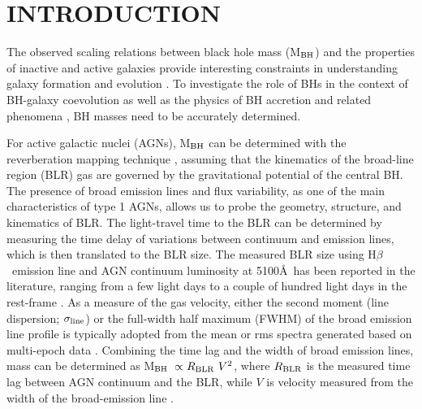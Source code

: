 \documentclass[iop]{emulateapj}
\newcommand{\Hb}{\rm H{$\beta$}}
\newcommand{\mbh}{M$_{\rm BH}$}
\newcommand{\sigmaline}{$\sigma_{\rm line}$}
\begin{document}
\section{INTRODUCTION} \label{section:intro}

The observed scaling relations between black hole mass (M$_{\rm BH}$) and the properties of inactive and active galaxies 
provide interesting constraints in understanding galaxy formation and evolution \citep[see][]{KormendyHo2013}. 
To investigate the role of BHs in the context of BH-galaxy coevolution \citep[e.g.,][]{Peng2006,Woo2006,Treu2007,Jahnke2009,Merloni2010,Bennert2010,Bennert2011b,Cisternas2011,Bennert2015,Park2015} as well as the physics of BH accretion and related phenomena \citep[e.g.,][]{WooUrry2002, Kollmeier2006,Davis2007,Bentz2013,Woo+16},
BH masses need to be accurately determined. 

For active galactic nuclei (AGNs),  M$_{\rm BH}$ can be determined with the reverberation mapping technique \citep{Blandford1982,Peterson1993},
assuming that the kinematics of the broad-line region (BLR) gas are governed by the gravitational potential of the central BH. 
The presence of broad emission lines and flux variability, as one of the main characteristics of type 1 AGNs, allows us to probe the geometry, structure, and kinematics of BLR. The light-travel time to the BLR can be determined by measuring the time delay of variations between continuum and emission lines, which is then translated to the BLR size. The measured BLR size using \Hb\ emission line and AGN continuum luminosity at 5100\AA\ has been reported in the literature, ranging from a few light days to a couple of hundred light days in the rest-frame \citep[e.g.,][]{Bentz2013}. As a measure of the gas velocity, either the second moment (line dispersion; \sigmaline) or the full-width half maximum (FWHM) of the broad emission line profile is typically adopted from the mean or rms spectra generated based on multi-epoch data \citep[see e.g.,][]{Peterson2004, Park2012}.
Combining the time lag and the width of broad emission lines, mass can be determined as \mbh\ $\propto R_{\rm BLR}~ V^2$, where $R_{\rm BLR}$ is the measured time lag between AGN continuum and the BLR, while $V$ is velocity measured from the width of the broad-emission line \citep{Peterson1993}.
\end{document}
